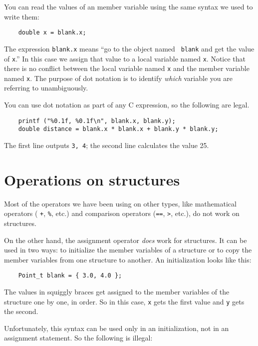 You can read the values of an member variable using the same syntax we
used to write them:

\begin{verbatim}
	double x = blank.x;
\end{verbatim}
%
The expression {\tt blank.x} means ``go to the object named {\tt
	blank} and get the value of {\tt x}.''  In this case we assign that
value to a local variable named {\tt x}.  Notice that there is no
conflict between the local variable named {\tt x} and the member
variable named {\tt x}.  The purpose of dot notation is to identify
{\em which} variable you are referring to unambiguously.

You can use dot notation as part of any C expression, so the
following are legal.

\begin{verbatim}
	printf ("%0.1f, %0.1f\n", blank.x, blank.y);
	double distance = blank.x * blank.x + blank.y * blank.y;
\end{verbatim}
%
The first line outputs {\tt 3, 4}; the second line calculates
the value 25.

\section{Operations on structures}

Most of the operators we have been using on other types, like
mathematical operators ( {\tt +}, {\tt \%}, etc.) and comparison
operators ({\tt ==}, {\tt >}, etc.), do not work on structures.

On the other hand, the assignment operator {\em does} work for
structures.  It can be used in two ways: to initialize the member
variables of a structure or to copy the member variables from one
structure to another.  An initialization looks like this:

\begin{verbatim}
	Point_t blank = { 3.0, 4.0 };
\end{verbatim}
%
The values in squiggly braces get assigned to the member variables of
the structure one by one, in order.  So in this case, {\tt x}
gets the first value and {\tt y} gets the second.

Unfortunately, this syntax can be used only in an initialization,
not in an assignment statement.  So the following is illegal:


